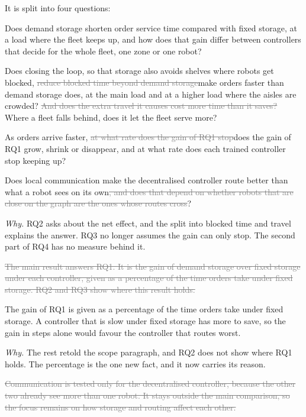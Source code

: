 \documentclass[11pt,a4paper]{article}
\newcommand{\new}[1]{\textcolor{newc}{#1}}
\newcommand{\old}[1]{\textcolor{gray}{\sout{#1}}}
\newcommand{\why}[1]{\textcolor{notec}{\small\emph{Why.} #1}\par}
\begin{document}
It is split into four questions:
\begin{description}[leftmargin=2.4em,style=nextline]
  \item[RQ1:] Does demand storage shorten order service time compared with fixed storage, at a load
    where the fleet keeps up, and how does that gain differ between controllers that decide for the
    whole fleet, one zone or one robot?
  \item[RQ2:] Does closing the loop, so that storage also avoids shelves where robots get blocked,
    \old{reduce blocked time beyond demand storage}\new{make orders faster than demand storage does},
    at the main load and at a higher load where the aisles are crowded? \old{And does the extra travel
    it causes cost more time than it saves?} \new{Where a fleet falls behind, does it let the fleet
    serve more?}
  \item[RQ3:] As orders arrive faster, \old{at what rate does the gain of RQ1 stop}\new{does the gain
    of RQ1 grow, shrink or disappear}, and at what rate does each trained controller stop keeping up?
  \item[RQ4:] Does local communication make the decentralised controller route better than what a
    robot sees on its own\old{, and does that depend on whether robots that are close on the graph
    are the ones whose routes cross}?
\end{description}

\why{RQ2 asks about the net effect, and the split into blocked time and travel explains the answer.
RQ3 no longer assumes the gain can only stop. The second part of RQ4 has no measure behind it.}

\old{The main result answers RQ1. It is the gain of demand storage over fixed storage under each
controller, given as a percentage of the time orders take under fixed storage. RQ2 and RQ3 show where
this result holds.}

\new{The gain of RQ1 is given as a percentage of the time orders take under fixed storage. A
controller that is slow under fixed storage has more to save, so the gain in steps alone would favour
the controller that routes worst.}

\why{The rest retold the scope paragraph, and RQ2 does not show where RQ1 holds. The percentage is the
one new fact, and it now carries its reason.}

\old{Communication is tested only for the decentralised controller, because the other two already see
more than one robot. It stays outside the main comparison, so the focus remains on how storage and
routing affect each other.}
\end{document}
